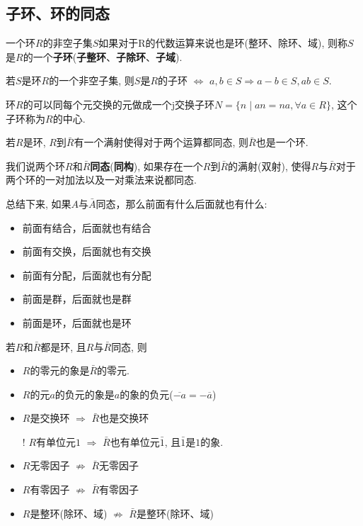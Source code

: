 \subsection{子环、环的同态} %

\begin{Definition}[子环]
一个环$R$的非空子集$S$如果对于R的代数运算来说也是环(整环、除环、域), 则称$S$是$R$的一个\textbf{子环}(\textbf{子整环}、\textbf{子除环}、\textbf{子域}).
\end{Definition}

\begin{Theorem}
若$S$是环$R$的一个非空子集, 则$S$是$R$的子环 $\iff$ $a, b \in S \Rightarrow a-b \in S, ab \in S$.
\end{Theorem}

\begin{Proposition}
环$R$的可以同每个元交换的元做成一个j交换子环$N = \{ n \mid a n = na, \forall a \in R\}$, 这个子环称为$R$的中心.
\end{Proposition}

\begin{Theorem}
若$R$是环, $R$到$\bar{R}$有一个满射使得对于两个运算都同态, 则$\bar{R}$也是一个环.
\end{Theorem}

\begin{Note}
我们说两个环$R$和$\bar{R}$\textbf{同态}(\textbf{同构}), 如果存在一个$R$到$\bar{R}$的满射(双射), 使得$R$与$\bar{R}$对于两个环的一对加法以及一对乘法来说都同态.
\end{Note}

\begin{Remark}
总结下来, 如果$A$与$\bar{A}$同态，那么前面有什么后面就也有什么:
\begin{itemize}
	\item 前面有结合，后面就也有结合
	\item 前面有交换，后面就也有交换
	\item 前面有分配，后面就也有分配
	\item 前面是群，后面就也是群
	\item 前面是环，后面就也是环
\end{itemize}
\end{Remark}

\begin{Theorem}
若$R$和$\bar{R}$都是环, 且$R$与$\bar{R}$同态, 则
\begin{itemize}
	\item $R$的零元的象是$\bar{R}$的零元.
	\item $R$的元$a$的负元的象是$a$的象的负元{($\overline{-a} = -\overline{a}$)}
	\item $R$是交换环 $\Rightarrow$ $\bar{R}$也是交换环
	\item[!] $R$有单位元$\mathfrak{1}$ $\Rightarrow$ $\bar{R}$也有单位元$\bar{\mathfrak{1}}$, 且$\bar{\mathfrak{1}}$是$\mathfrak{1}$的象.
	\item $R$无零因子 $\not\Rightarrow$ $\bar{R}$无零因子
	\item $R$有零因子 $\not\Rightarrow$ $\bar{R}$有零因子
	\item $R$是整环(除环、域) $\not\Rightarrow$ $\bar{R}$是整环(除环、域)
\end{itemize}
\end{Theorem}

